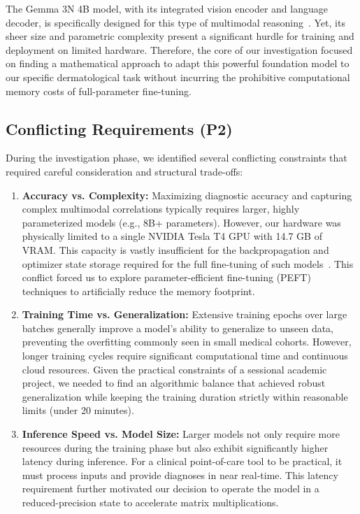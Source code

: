 \documentclass[11pt]{article}
\begin{document}
The Gemma 3N 4B model, with its integrated vision encoder and language decoder, is specifically designed for this type of multimodal reasoning~\cite{gemma_3n_2025}. Yet, its sheer size and parametric complexity present a significant hurdle for training and deployment on limited hardware. Therefore, the core of our investigation focused on finding a mathematical approach to adapt this powerful foundation model to our specific dermatological task without incurring the prohibitive computational memory costs of full-parameter fine-tuning.

\subsection{Conflicting Requirements (P2)}
During the investigation phase, we identified several conflicting constraints that required careful consideration and structural trade-offs:
\begin{enumerate}
    \item \textbf{Accuracy vs. Complexity:} Maximizing diagnostic accuracy and capturing complex multimodal correlations typically requires larger, highly parameterized models (e.g., 8B+ parameters). However, our hardware was physically limited to a single NVIDIA Tesla T4 GPU with 14.7 GB of VRAM. This capacity is vastly insufficient for the backpropagation and optimizer state storage required for the full fine-tuning of such models~\cite{dettmers2023qlora}. This conflict forced us to explore parameter-efficient fine-tuning (PEFT) techniques to artificially reduce the memory footprint.
    \item \textbf{Training Time vs. Generalization:} Extensive training epochs over large batches generally improve a model's ability to generalize to unseen data, preventing the overfitting commonly seen in small medical cohorts. However, longer training cycles require significant computational time and continuous cloud resources. Given the practical constraints of a sessional academic project, we needed to find an algorithmic balance that achieved robust generalization while keeping the training duration strictly within reasonable limits (under 20 minutes).
    \item \textbf{Inference Speed vs. Model Size:} Larger models not only require more resources during the training phase but also exhibit significantly higher latency during inference. For a clinical point-of-care tool to be practical, it must process inputs and provide diagnoses in near real-time. This latency requirement further motivated our decision to operate the model in a reduced-precision state to accelerate matrix multiplications.
\end{enumerate}
\end{document}
